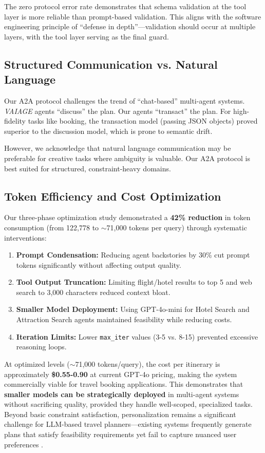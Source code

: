 \documentclass[10pt,twocolumn]{article}
\begin{document}
The zero protocol error rate demonstrates that schema validation at the tool layer is more reliable than prompt-based validation. This aligns with the software engineering principle of ``defense in depth''---validation should occur at multiple layers, with the tool layer serving as the final guard.

\subsection{Structured Communication vs. Natural Language}
Our A2A protocol challenges the trend of ``chat-based'' multi-agent systems. \textit{VAIAGE} agents ``discuss'' the plan. Our agents ``transact'' the plan. For high-fidelity tasks like booking, the transaction model (passing JSON objects) proved superior to the discussion model, which is prone to semantic drift.

However, we acknowledge that natural language communication may be preferable for creative tasks where ambiguity is valuable. Our A2A protocol is best suited for structured, constraint-heavy domains.

\subsection{Token Efficiency and Cost Optimization}
Our three-phase optimization study demonstrated a \textbf{42\% reduction} in token consumption (from 122,778 to $\sim$71,000 tokens per query) through systematic interventions:
\begin{enumerate}
    \item \textbf{Prompt Condensation:} Reducing agent backstories by 30\% cut prompt tokens significantly without affecting output quality.
    \item \textbf{Tool Output Truncation:} Limiting flight/hotel results to top 5 and web search to 3,000 characters reduced context bloat.
    \item \textbf{Smaller Model Deployment:} Using GPT-4o-mini for Hotel Search and Attraction Search agents maintained feasibility while reducing costs.
    \item \textbf{Iteration Limits:} Lower \texttt{max\_iter} values (3-5 vs. 8-15) prevented excessive reasoning loops.
\end{enumerate}

At optimized levels ($\sim$71,000 tokens/query), the cost per itinerary is approximately \textbf{\$0.55-0.90} at current GPT-4o pricing, making the system commercially viable for travel booking applications. This demonstrates that \textbf{smaller models can be strategically deployed} in multi-agent systems without sacrificing quality, provided they handle well-scoped, specialized tasks. Beyond basic constraint satisfaction, personalization remains a significant challenge for LLM-based travel planners---existing systems frequently generate plans that satisfy feasibility requirements yet fail to capture nuanced user preferences \cite{shen2025triptailor, dhote2025smart}.
\end{document}
